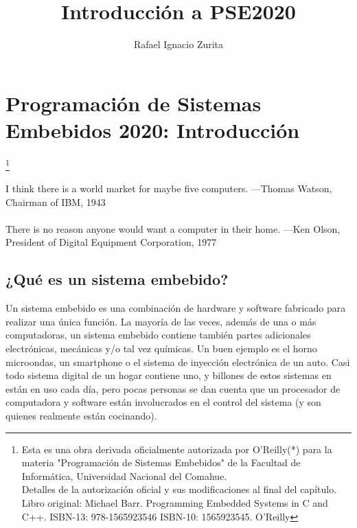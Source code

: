\documentclass[output=paper, 
colorlinks,
citecolor=brown,
newtxmath
]{langscibook}
\author{Rafael Ignacio Zurita\affiliation{Universidad Nacional del Comahue}}
\title{Introducción a PSE2020}
\begin{document}

\chapterfont{\Large\color{LightBlue}} 
\chapter*{ Programación de Sistemas Embebidos 2020: Introducción}

\begingroup
\let\clearpage\relax
\cleardoublepage
\hypersetup{linkcolor=blue}
\tableofcontents*
\endgroup


\footnote{\scriptsize\normalfont Esta es una obra derivada oficialmente autorizada por O'Reilly(*) para la materia "Programación de Sistemas Embebidos" de la Facultad de Informática, Universidad Nacional del Comahue. \\ Detalles de la autorización oficial y sus modificaciones al final del capítulo. \\ Libro original: Michael Barr. Programming Embedded Systems in C and C++. ISBN-13: 978-1565923546
ISBN-10: 1565923545. O'Reilly }

{\def\addcontentsline#1#2#3{}\maketitle}



\hfill\begin{minipage}{0.8\linewidth} \footnotesize
I think there is a world market for maybe five computers.
—Thomas Watson, Chairman of IBM, 1943 \\
\\
There is no reason anyone would want a computer in their home.
—Ken Olson, President of Digital Equipment Corporation, 1977 \\
\end{minipage}





\section {¿Qué es un sistema embebido?}

Un sistema embebido es una combinación de hardware y software fabricado para realizar una única función. La mayoría de las veces, además de una o más computadoras, un sistema embebido contiene también partes adicionales electrónicas, mecánicas y/o tal vez químicas. 
Un buen ejemplo es el horno microondas, un smartphone o el sistema de inyección electrónica de un auto.
Casi todo sistema digital de un hogar contiene uno, y billones de estos sistemas en están en uso 
cada día, pero pocas personas se dan cuenta que un procesador de computadora y software están
involucrados en el control del sistema (y son quienes realmente están cocinando).
\end{document}
